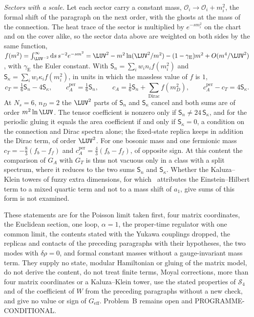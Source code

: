 \emph{Sectors with a scale.} Let each sector carry a constant mass, \(\mathcal O_i\to\mathcal O_i+m_i^2\), the formal shift of the paragraph on the next order, with the ghosts at the mass of the connection. The heat trace of the sector is multiplied by \(e^{-sm_i^2}\) on the chart and on the cover alike, so the sector data above are weighted on both sides by the same function, \(f(m^2)=\int_{\LUV^{-2}}^\infty\mathrm ds\,s^{-2}e^{-sm^2}=\LUV^2-m^2\ln(\LUV^2/m^2)-(1-\gamma_{\mathrm E})m^2+O(m^4/\LUV^2)\), with \(\gamma_{\mathrm E}\) the Euler constant. With \(\mathsf S_n=\sum_iw_in_if(m_i^2)\) and \(\mathsf S_\kappa=\sum_iw_i\kappa_if(m_i^2)\), in units in which the massless value of \(f\) is \(1\),
\[
  c_T=\tfrac16\mathsf S_n-4\mathsf S_\kappa,\qquad c_A^{\mathrm{per}}=\tfrac16\mathsf S_n,\qquad c_A=\tfrac16\mathsf S_n+\sum_{\text{Dirac}}f(m_D^2),\qquad c_A^{\mathrm{per}}-c_T=4\mathsf S_\kappa .
\]
At \(N_s=6\), \(n_D=2\) the \(\LUV^2\) parts of \(\mathsf S_n\) and \(\mathsf S_\kappa\) cancel and both sums are of order \(m^2\ln\LUV\). The tensor coefficient is nonzero only if \(\mathsf S_n\neq24\,\mathsf S_\kappa\), and for the periodic gluing it equals the area coefficient if and only if \(\mathsf S_\kappa=0\), a condition on the connection and Dirac spectra alone; the fixed-state replica keeps in addition the Dirac term, of order \(\LUV^2\). For one bosonic mass and one fermionic mass \(c_T=-\tfrac83(f_b-f_f)\) and \(c_A^{\mathrm{per}}=\tfrac43(f_b-f_f)\), of opposite sign. At this content the comparison of \(G_A\) with \(G_T\) is thus not vacuous only in a class with a split spectrum, where it reduces to the two sums \(\mathsf S_n\) and \(\mathsf S_\kappa\). Whether the Kaluza--Klein towers of fuzzy extra dimensions, for which~\cite{Steinacker2023} attributes the Einstein--Hilbert term to a mixed quartic term and not to a mass shift of \(a_1\), give sums of this form is not examined.

These statements are for the Poisson limit taken first, four matrix coordinates, the Euclidean section, one loop, \(\alpha=1\), the proper-time regulator with one common limit, the contents stated with the Yukawa couplings dropped, the replicas and contacts of the preceding paragraphs with their hypotheses, the two modes with \(\delta\rho=0\), and formal constant masses without a gauge-invariant mass term. They supply no state, modular Hamiltonian or gluing of the matrix model, do not derive the content, do not treat finite terms, Moyal corrections, more than four matrix coordinates or a Kaluza--Klein tower, use the stated properties of \(\mathcal S_4\) and of the coefficient of \(W\) from the preceding paragraphs without a new check, and give no value or sign of \(G_{\mathrm{eff}}\). Problem~B remains open and PROGRAMME-CONDITIONAL.

